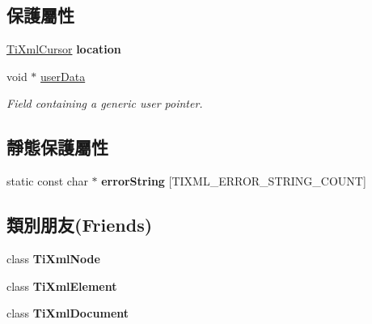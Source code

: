 \subsection*{保護屬性}
\begin{DoxyCompactItemize}
\item 
\hyperlink{struct_ti_xml_cursor}{Ti\+Xml\+Cursor} {\bfseries location}\hypertarget{class_ti_xml_base_a0d992580f3bc264909f898e942677a3c}{}\label{class_ti_xml_base_a0d992580f3bc264909f898e942677a3c}

\item 
void $\ast$ \hyperlink{class_ti_xml_base_ab242c01590191f644569fa89a080d97c}{user\+Data}\hypertarget{class_ti_xml_base_ab242c01590191f644569fa89a080d97c}{}\label{class_ti_xml_base_ab242c01590191f644569fa89a080d97c}

\begin{DoxyCompactList}\small\item\em Field containing a generic user pointer. \end{DoxyCompactList}\end{DoxyCompactItemize}
\subsection*{靜態保護屬性}
\begin{DoxyCompactItemize}
\item 
static const char $\ast$ {\bfseries error\+String} \mbox{[}T\+I\+X\+M\+L\+\_\+\+E\+R\+R\+O\+R\+\_\+\+S\+T\+R\+I\+N\+G\+\_\+\+C\+O\+U\+NT\mbox{]}
\end{DoxyCompactItemize}
\subsection*{類別朋友(Friends)}
\begin{DoxyCompactItemize}
\item 
class {\bfseries Ti\+Xml\+Node}\hypertarget{class_ti_xml_base_a218872a0d985ae30e78c55adc4bdb196}{}\label{class_ti_xml_base_a218872a0d985ae30e78c55adc4bdb196}

\item 
class {\bfseries Ti\+Xml\+Element}\hypertarget{class_ti_xml_base_ab6592e32cb9132be517cc12a70564c4b}{}\label{class_ti_xml_base_ab6592e32cb9132be517cc12a70564c4b}

\item 
class {\bfseries Ti\+Xml\+Document}\hypertarget{class_ti_xml_base_a173617f6dfe902cf484ce5552b950475}{}\label{class_ti_xml_base_a173617f6dfe902cf484ce5552b950475}

\end{DoxyCompactItemize}


